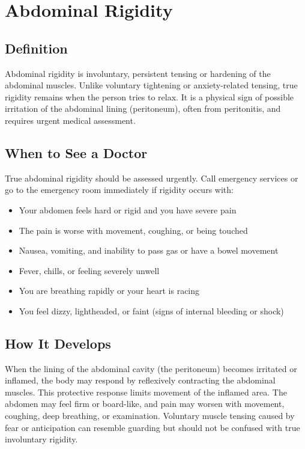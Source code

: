 \chapter{Abdominal Rigidity}

\section*{Definition}
Abdominal rigidity is involuntary, persistent tensing or hardening of the abdominal muscles. Unlike voluntary tightening or anxiety-related tensing, true rigidity remains when the person tries to relax. It is a physical sign of possible irritation of the abdominal lining (peritoneum), often from peritonitis, and requires urgent medical assessment.

\section*{When to See a Doctor}
True abdominal rigidity should be assessed urgently. Call emergency services or go to the emergency room immediately if rigidity occurs with:
\begin{itemize}
  \item Your abdomen feels hard or rigid and you have severe pain
  \item The pain is worse with movement, coughing, or being touched
  \item Nausea, vomiting, and inability to pass gas or have a bowel movement
  \item Fever, chills, or feeling severely unwell
  \item You are breathing rapidly or your heart is racing
  \item You feel dizzy, lightheaded, or faint (signs of internal bleeding or shock)
\end{itemize}

\section*{How It Develops}
When the lining of the abdominal cavity (the peritoneum) becomes irritated or inflamed, the body may respond by reflexively contracting the abdominal muscles. This protective response limits movement of the inflamed area. The abdomen may feel firm or board-like, and pain may worsen with movement, coughing, deep breathing, or examination. Voluntary muscle tensing caused by fear or anticipation can resemble guarding but should not be confused with true involuntary rigidity.

